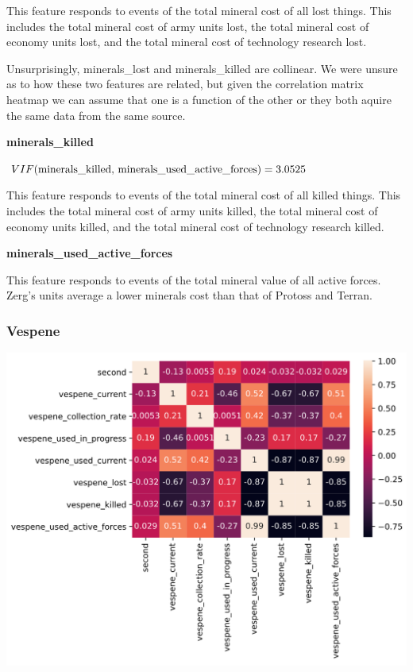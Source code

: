 \documentclass[a4paper,12pt]{report}
\newcommand{\msection}[1]{\noindent\textbf{#1}}
\begin{document}
This feature responds to events of the total mineral cost of all lost things. This includes the total mineral cost of army units lost, the total mineral cost of economy units lost, and the total mineral cost of technology research lost.

Unsurprisingly, minerals\_lost and minerals\_killed are collinear. We were unsure as to how these two features are related, but given the correlation matrix heatmap we can assume that one is a function of the other or they both aquire the same data from the same source.

\msection{minerals\_killed}

$VIF(\text{minerals\_killed, minerals\_used\_active\_forces}) = \pgfmathparse{1/(1-(-.82)^2)}\pgfmathresult$

This feature responds to events of the total mineral cost of all killed things. This includes the total mineral cost of army units killed, the total mineral cost of economy units killed, and the total mineral cost of technology research killed.

\msection{minerals\_used\_active\_forces}

This feature responds to events of the total mineral value of all active forces. Zerg's units average a lower minerals cost than that of Protoss and Terran.

\vspace*{.5cm}
\subsubsection{Vespene}
\begin{center}
    \captionsetup{type=figure}
    \includegraphics[width=.75\linewidth]{media/vespene_types.png}
\end{center}
\end{document}
